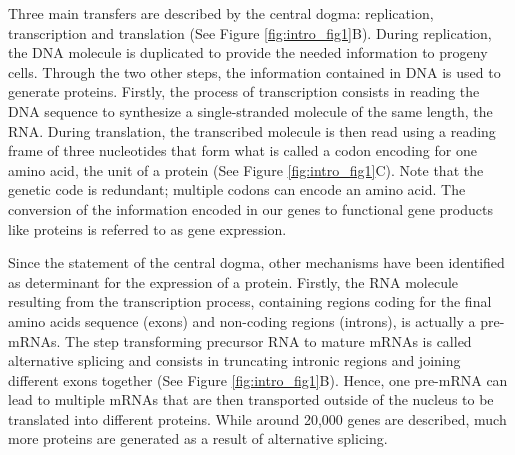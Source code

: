 Three main transfers are described by the central dogma: replication, transcription and translation (See Figure \ref{fig:intro_fig1}B). During replication, the \gls*{DNA} molecule is duplicated to provide the needed information to progeny cells. Through the two other steps, the information contained in \gls*{DNA} is used to generate proteins. Firstly, the process of transcription consists in reading the \gls*{DNA} sequence to synthesize a single-stranded molecule of the same length, the \gls{RNA}. During translation, the transcribed molecule is then read using a reading frame of three nucleotides that form what is called a codon encoding for one amino acid, the unit of a protein (See Figure \ref{fig:intro_fig1}C). Note that the genetic code is redundant; multiple codons can encode an amino acid. The conversion of the information encoded in our genes to functional gene products like proteins is referred to as gene expression.

Since the statement of the central dogma, other mechanisms have been identified as determinant for the expression of a protein. Firstly, the \gls*{RNA} molecule resulting from the transcription process, containing regions coding for the final amino acids sequence (exons) and non-coding regions (introns), is actually a \gls{pre-mRNAs}. The step transforming precursor \gls*{RNA} to mature \gls{mRNAs} is called alternative splicing and consists in truncating intronic regions and joining different exons together (See Figure \ref{fig:intro_fig1}B). Hence, one pre-mRNA can lead to multiple \gls{mRNAs} that are then transported outside of the nucleus to be translated into different proteins. While around 20,000 genes are described, much more proteins are generated as a result of alternative splicing.

